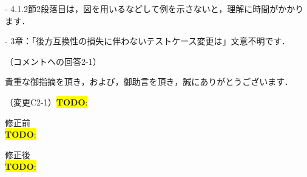 \documentclass{jarticle} %
\newcommand{\todo}[1]{\colorbox{yellow}{{\bf TODO}:}{\color{red}{\textbf{[#1]}}}}
\def\subsection#1{ \vspace{1pc} {\gt #1} }
\begin{document}
- 4.1.2節2段落目は，図を用いるなどして例を示さないと，理解に時間がかかります．

- 3章：「後方互換性の損失に伴わないテストケース変更は」文意不明です．

\subsection{（コメントへの回答2-1）}

貴重な御指摘を頂き，および，御助言を頂き，誠にありがとうございます．

\subsection{（変更C2-1）\todo{hoge}}
\vspace{-0.3cm}
\begin{description}
\item 修正前\\
\phantom{　}
\todo{hoge}
\vspace{-0.3cm}
\item 修正後\\
\phantom{　}
\todo{hoge}
\end{description}



	
\end{document}
